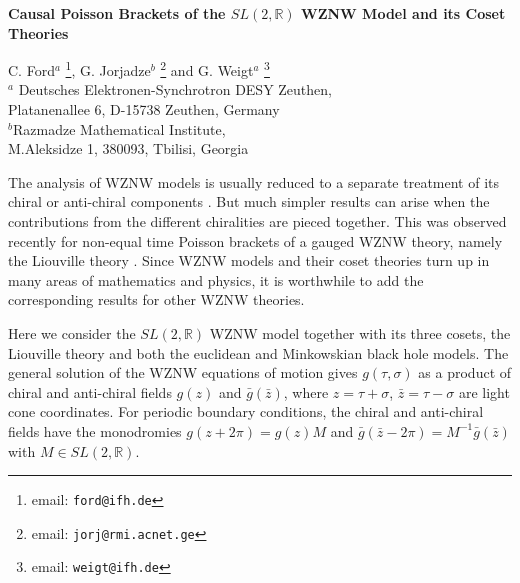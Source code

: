 \documentclass[a4paper,12pt]{article}
\renewcommand{\title}[1]{\begin{center}\bf\Large #1\end{center}}
\renewcommand{\author}[1]{\begin{center}\large #1\end{center}}
\newcommand{\rr}{\mathbb{R}}
\begin{document}
\title{Causal Poisson Brackets of the $SL(2,\rr)$ WZNW Model
  and its Coset Theories}
\author{
C. Ford${}^a$
\footnote{email: \tt ford@ifh.de},
 G. Jorjadze${}^b$
\footnote{email: \tt jorj@rmi.acnet.ge}
 and G. Weigt${}^a$
\footnote{email: \tt weigt@ifh.de}\\
{\small${}^a$ Deutsches Elektronen-Synchrotron DESY Zeuthen,\\
    Platanenallee 6, D-15738 Zeuthen, Germany}\\
{\small${}^b$Razmadze Mathematical Institute,}\\
  {\small M.Aleksidze 1, 380093, Tbilisi, Georgia}}




\begin{abstract}
From the basic chiral and anti-chiral Poisson bracket algebra of the
$SL(2,\rr)$ WZNW model, non-equal time  Poisson brackets are derived.
Through Hamiltonian reduction we deduce the corresponding brackets
for its coset theories.
\end{abstract}

\baselineskip=20pt

\vspace{0.3cm}

The analysis of WZNW models is usually reduced to a separate treatment
of its chiral or anti-chiral components \cite{Goddard, Gawedzki, BFP}.
But much simpler results can arise when the contributions from the
different chiralities are pieced together.  This was observed recently
for non-equal time Poisson brackets of a gauged WZNW theory, namely
the Liouville theory \cite{JW}. Since WZNW models and their coset
theories turn up in many areas of mathematics and physics, it is
worthwhile to add the corresponding results for other WZNW theories.


Here we consider the $SL(2,\rr)$ WZNW model together with its three
cosets, the Liouville theory and both the euclidean and Minkowskian
black hole models.  The general solution of the WZNW equations of
motion gives $g(\tau,\sigma)$ as a product of chiral and anti-chiral
fields $g(z)$ and $\bar g(\bar z)$, where $z=\tau +\sigma$, $\bar
z=\tau -\sigma$ are light cone coordinates.  For periodic boundary
conditions, the chiral and anti-chiral fields have the monodromies
$g(z+2\pi)=g(z)M$ and $\bar g(\bar z -2\pi)=M^{-1}\bar g(\bar z)$ with
$M\in SL(2,\rr)$.
\end{document}
